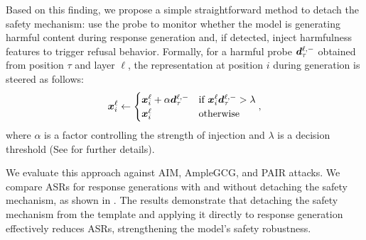 Based on this finding, we propose a simple straightforward method to detach the safety mechanism: use the probe to monitor whether the model is generating harmful content during response generation and, if detected, inject harmfulness features to trigger refusal behavior.
Formally, for a harmful probe \({\bm{d}}^{\ell,-}_{\tau}\) obtained from position \(\tau\) and layer \(\ell\), the representation at position \(i\) during generation is steered as follows:
\begin{equation}
\label{eq:detach}
    {\bm{x}}_i^\ell \leftarrow \begin{cases} 
    {\bm{x}}_i^\ell + \alpha{\bm{d}}^{\ell,-}_{\tau} & \text{if } {\bm{x}}_i^\ell{\bm{d}}^{\ell,-}_{\tau} > \lambda \\
    {\bm{x}}_i^\ell & \text{otherwise}
\end{cases},
\end{equation}
where \(\alpha\) is a factor controlling the strength of injection and \(\lambda\) is a decision threshold (See  for further details).

We evaluate this approach against AIM, AmpleGCG, and PAIR attacks.
We compare ASRs for response generations with and without detaching the safety mechanism, as shown in . The results demonstrate that detaching the safety mechanism from the template and applying it directly to response generation effectively reduces ASRs, strengthening the model's safety robustness.


